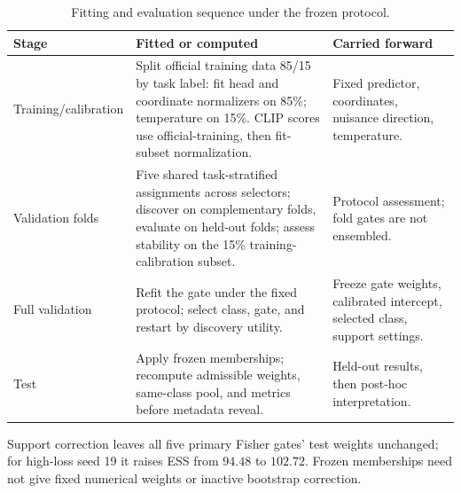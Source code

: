 \begin{table}[htbp]
\centering\small
\caption{Fitting and evaluation sequence under the frozen protocol.}
\label{tab:c-discovery-sequence}
\setlength{\tabcolsep}{4pt}
\begin{tabular}{@{}>{\raggedright\arraybackslash}p{.18\linewidth}>{\raggedright\arraybackslash}p{.50\linewidth}>{\raggedright\arraybackslash}p{.27\linewidth}@{}}
\toprule
Stage & Fitted or computed & Carried forward\\
\midrule
Training/calibration & Split official training data 85/15 by task label: fit head and coordinate normalizers on 85\%; temperature on 15\%. CLIP scores use official-training, then fit-subset normalization. & Fixed predictor, coordinates, nuisance direction, temperature.\\
Validation folds & Five shared task-stratified assignments across selectors; discover on complementary folds, evaluate on held-out folds; assess stability on the 15\% training-calibration subset. & Protocol assessment; fold gates are not ensembled.\\
Full validation & Refit the gate under the fixed protocol; select class, gate, and restart by discovery utility. & Freeze gate weights, calibrated intercept, selected class, support settings.\\
Test & Apply frozen memberships; recompute admissible weights, same-class pool, and metrics before metadata reveal. & Held-out results, then post-hoc interpretation.\\
\bottomrule
\end{tabular}
\par\smallskip
\begin{minipage}{\linewidth}\normalsize
Support correction leaves all five primary Fisher gates' test weights unchanged; for high-loss seed 19 it raises ESS from $94.48$ to $102.72$. Frozen memberships need not give fixed numerical weights or inactive bootstrap correction.
\end{minipage}
\end{table}

